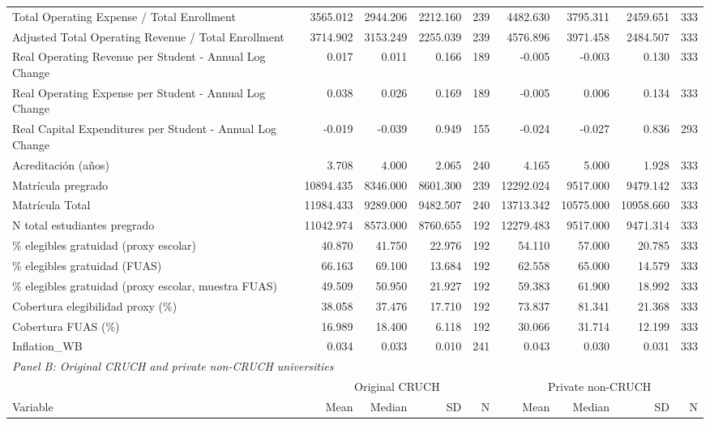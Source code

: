 \begin{table}[!htbp]
{\begin{tabular}{lrrrrrrrr}
Total Operating Expense / Total Enrollment & 3565.012 & 2944.206 & 2212.160 & 239 & 4482.630 & 3795.311 & 2459.651 & 333 \\
Adjusted Total Operating Revenue / Total Enrollment & 3714.902 & 3153.249 & 2255.039 & 239 & 4576.896 & 3971.458 & 2484.507 & 333 \\
Real Operating Revenue per Student - Annual Log Change & 0.017 & 0.011 & 0.166 & 189 & -0.005 & -0.003 & 0.130 & 333 \\
Real Operating Expense per Student - Annual Log Change & 0.038 & 0.026 & 0.169 & 189 & -0.005 & 0.006 & 0.134 & 333 \\
Real Capital Expenditures per Student - Annual Log Change & -0.019 & -0.039 & 0.949 & 155 & -0.024 & -0.027 & 0.836 & 293 \\
Acreditación (años) & 3.708 & 4.000 & 2.065 & 240 & 4.165 & 5.000 & 1.928 & 333 \\
Matrícula pregrado & 10894.435 & 8346.000 & 8601.300 & 239 & 12292.024 & 9517.000 & 9479.142 & 333 \\
Matrícula Total & 11984.433 & 9289.000 & 9482.507 & 240 & 13713.342 & 10575.000 & 10958.660 & 333 \\
N total estudiantes pregrado & 11042.974 & 8573.000 & 8760.655 & 192 & 12279.483 & 9517.000 & 9471.314 & 333 \\
\% elegibles gratuidad (proxy escolar) & 40.870 & 41.750 & 22.976 & 192 & 54.110 & 57.000 & 20.785 & 333 \\
\% elegibles gratuidad (FUAS) & 66.163 & 69.100 & 13.684 & 192 & 62.558 & 65.000 & 14.579 & 333 \\
\% elegibles gratuidad (proxy escolar, muestra FUAS) & 49.509 & 50.950 & 21.927 & 192 & 59.383 & 61.900 & 18.992 & 333 \\
Cobertura elegibilidad proxy (\%) & 38.058 & 37.476 & 17.710 & 192 & 73.837 & 81.341 & 21.368 & 333 \\
Cobertura FUAS (\%) & 16.989 & 18.400 & 6.118 & 192 & 30.066 & 31.714 & 12.199 & 333 \\
Inflation\_WB & 0.034 & 0.033 & 0.010 & 241 & 0.043 & 0.030 & 0.031 & 333 \\
\midrule
\multicolumn{9}{l}{\textit{Panel B: Original CRUCH and private non-CRUCH universities}} \\
 & \multicolumn{4}{c}{Original CRUCH} & \multicolumn{4}{c}{Private non-CRUCH} \\
\cmidrule(lr){2-5}\cmidrule(lr){6-9}
Variable & Mean & Median & SD & N & Mean & Median & SD & N \\

\end{tabular}}
\end{table}
